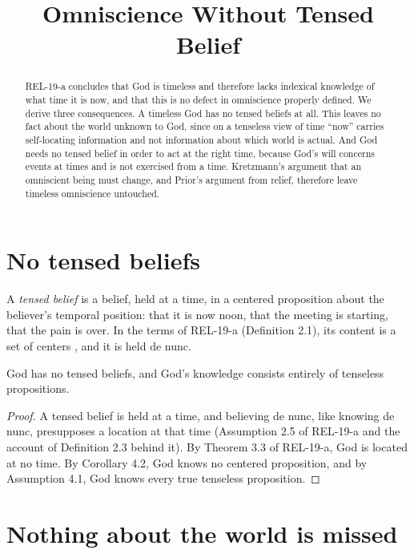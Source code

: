 \documentclass{situationist-preprint}
\title{Omniscience Without Tensed Belief}
\begin{document}
\maketitle

\begin{abstract}
REL-19-a concludes that God is timeless and therefore lacks indexical knowledge of what time it is now, and that this is no defect in omniscience properly defined. We derive three consequences. A timeless God has no tensed beliefs at all. This leaves no fact about the world unknown to God, since on a tenseless view of time \enquote{now} carries self-locating information and not information about which world is actual. And God needs no tensed belief in order to act at the right time, because God's will concerns events at times and is not exercised from a time. Kretzmann's argument that an omniscient being must change, and Prior's argument from relief, therefore leave timeless omniscience untouched.
\end{abstract}

\section{No tensed beliefs}

A \emph{tensed belief} is a belief, held at a time, in a centered proposition about the believer's temporal position: that it is now noon, that the meeting is starting, that the pain is over. In the terms of REL-19-a (Definition 2.1), its content is a set of centers \citep{Lewis1979}, and it is held de nunc.

\begin{proposition}\label{p:notensed}
God has no tensed beliefs, and God's knowledge consists entirely of tenseless propositions.
\end{proposition}

\begin{proof}
A tensed belief is held at a time, and believing de nunc, like knowing de nunc, presupposes a location at that time (Assumption 2.5 of REL-19-a and the account of Definition 2.3 behind it). By Theorem 3.3 of REL-19-a, God is located at no time. By Corollary 4.2, God knows no centered proposition, and by Assumption 4.1, God knows every true tenseless proposition.
\end{proof}

\section{Nothing about the world is missed}
\end{document}
